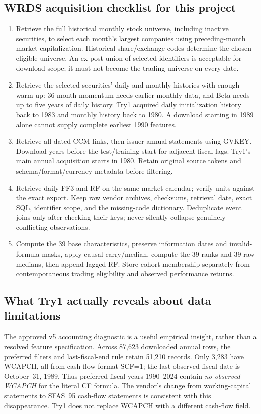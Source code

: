 \documentclass[11pt]{article}
\begin{document}
\subsection{WRDS acquisition checklist for this project}
\begin{enumerate}
\item Retrieve the full historical monthly stock universe, including inactive securities, to select each month's largest companies using preceding-month market capitalization. Historical share/exchange codes determine the chosen eligible universe. An ex-post union of selected identifiers is acceptable for download scope; it must not become the trading universe on every date.
\item Retrieve the selected securities' daily and monthly histories with enough warm-up: 36-month momentum needs earlier monthly data, and Beta needs up to five years of daily history. Try1 acquired daily initialization history back to 1983 and monthly history back to 1980. A download starting in 1989 alone cannot supply complete earliest 1990 features.
\item Retrieve all dated CCM links, then issuer annual statements using GVKEY. Download years before the test/training start for adjacent fiscal lags. Try1's main annual acquisition starts in 1980. Retain original source tokens and schema/format/currency metadata before filtering.
\item Retrieve daily FF3 and RF on the same market calendar; verify units against the exact export. Keep raw vendor archives, checksums, retrieval date, exact SQL, identifier scope, and the missing-code dictionary. Deduplicate event joins only after checking their keys; never silently collapse genuinely conflicting observations.
\item Compute the 39 base characteristics, preserve information dates and invalid-formula masks, apply causal carry/median, compute the 39 ranks and 39 raw medians, then append lagged RF. Store cohort membership separately from contemporaneous trading eligibility and observed performance returns.
\end{enumerate}

\subsection{What Try1 actually reveals about data limitations}
The approved v5 accounting diagnostic is a useful empirical insight, rather than a resolved feature specification. Across 87,623 downloaded annual rows, the preferred filters and last-fiscal-end rule retain 51,210 records. Only 3,283 have WCAPCH, all from cash-flow format SCF=1; the last observed fiscal date is October~31, 1989. Thus preferred fiscal years 1990--2024 contain \emph{no observed WCAPCH} for the literal CF formula. The vendor's change from working-capital statements to SFAS~95 cash-flow statements is consistent with this disappearance. Try1 does not replace WCAPCH with a different cash-flow field.
\end{document}
